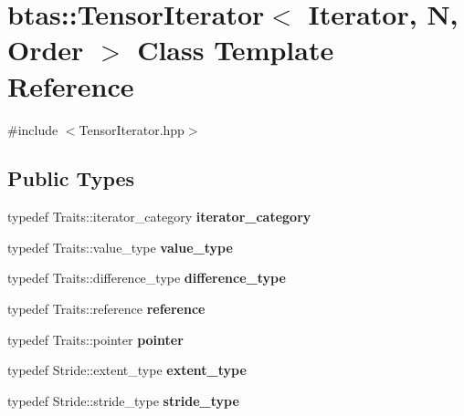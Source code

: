 \hypertarget{classbtas_1_1_tensor_iterator}{
\section{btas::TensorIterator$<$ Iterator, N, Order $>$ Class Template Reference}
\label{classbtas_1_1_tensor_iterator}
}


{\ttfamily \#include $<$TensorIterator.hpp$>$}\subsection*{Public Types}
\begin{DoxyCompactItemize}
\item 
\hypertarget{classbtas_1_1_tensor_iterator_accca41ecef74b5372a29a80ab7afd7a9}{
typedef Traits::iterator\_\-category {\bfseries iterator\_\-category}}
\label{classbtas_1_1_tensor_iterator_accca41ecef74b5372a29a80ab7afd7a9}

\item 
\hypertarget{classbtas_1_1_tensor_iterator_a2e0e792b2b4a4d6a55c6576f9dc23a81}{
typedef Traits::value\_\-type {\bfseries value\_\-type}}
\label{classbtas_1_1_tensor_iterator_a2e0e792b2b4a4d6a55c6576f9dc23a81}

\item 
\hypertarget{classbtas_1_1_tensor_iterator_aae3d81969142b786f4146e8c51334fa9}{
typedef Traits::difference\_\-type {\bfseries difference\_\-type}}
\label{classbtas_1_1_tensor_iterator_aae3d81969142b786f4146e8c51334fa9}

\item 
\hypertarget{classbtas_1_1_tensor_iterator_a3b80e1d62a021263505d0f16755c330a}{
typedef Traits::reference {\bfseries reference}}
\label{classbtas_1_1_tensor_iterator_a3b80e1d62a021263505d0f16755c330a}

\item 
\hypertarget{classbtas_1_1_tensor_iterator_a7821300a31f142ace986c7c7601b4a07}{
typedef Traits::pointer {\bfseries pointer}}
\label{classbtas_1_1_tensor_iterator_a7821300a31f142ace986c7c7601b4a07}

\item 
\hypertarget{classbtas_1_1_tensor_iterator_aa1eb99fa20cf8c2deac826e191bc8984}{
typedef Stride::extent\_\-type {\bfseries extent\_\-type}}
\label{classbtas_1_1_tensor_iterator_aa1eb99fa20cf8c2deac826e191bc8984}

\item 
\hypertarget{classbtas_1_1_tensor_iterator_a7ed6b5d7472b7e73c61258b339f2fdb7}{
typedef Stride::stride\_\-type {\bfseries stride\_\-type}}
\label{classbtas_1_1_tensor_iterator_a7ed6b5d7472b7e73c61258b339f2fdb7}


\end{DoxyCompactItemize}
